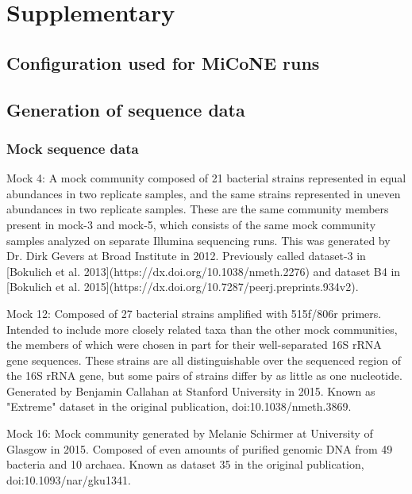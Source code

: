
\newpage
\section*{Supplementary}

  \renewcommand{\thefigure}{S\arabic{figure}}
  \setcounter{figure}{0}

  \renewcommand{\thetable}{S\arabic{table}}
  \setcounter{table}{0}

  
  
  \subsection{Configuration used for MiCoNE runs}
  
  \subsection{Generation of sequence data}
  
  \subsubsection{Mock sequence data}
  Mock 4: A mock community composed of 21 bacterial strains represented in equal abundances in two replicate samples, and the same strains represented in uneven abundances in two replicate samples. These are the same community members present in mock-3 and mock-5, which consists of the same mock community samples analyzed on separate Illumina sequencing runs. This was generated by Dr. Dirk Gevers at Broad Institute in 2012. Previously called dataset-3 in [Bokulich et al. 2013](https://dx.doi.org/10.1038/nmeth.2276) and dataset B4 in [Bokulich et al. 2015](https://dx.doi.org/10.7287/peerj.preprints.934v2).
  
  Mock 12: Composed of 27 bacterial strains amplified with 515f/806r primers. Intended to include more closely related taxa than the other mock communities, the members of which were chosen in part for their well-separated 16S rRNA gene sequences. These strains are all distinguishable over the sequenced region of the 16S rRNA gene, but some pairs of strains differ by as little as one nucleotide. Generated by Benjamin Callahan at Stanford University in 2015. Known as "Extreme" dataset in the original publication, doi:10.1038/nmeth.3869.
  
  Mock 16: Mock community generated by Melanie Schirmer at University of Glasgow in 2015. Composed of even amounts of purified genomic DNA from 49 bacteria and 10 archaea. Known as dataset 35 in the original publication, doi:10.1093/nar/gku1341.
  
